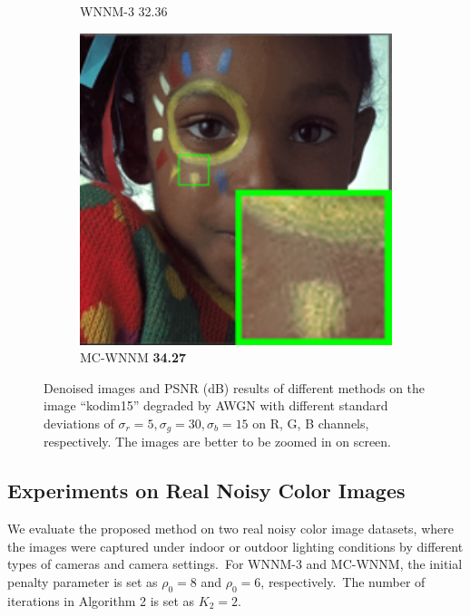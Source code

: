 \begin{figure}
\begin{subfigure}[t]{0.19\textwidth}
		\caption{WNNM-3 32.36}
    \end{subfigure}
    \hfill
    \begin{subfigure}[t]{0.19\textwidth}
        \centering
        \includegraphics[width=1\textwidth]{images/mcwnnm/24images/resize_br_CWNNM_ADMM_nSig53015_kodim15.png}
		\caption{MC-WNNM \textbf{34.27}}
    \end{subfigure}
    \caption{Denoised images and PSNR (dB) results of different methods on the image ``kodim15'' degraded by AWGN with different standard deviations of $\sigma_{r}=5, \sigma_{g}=30, \sigma_{b}=15$ on R, G, B channels, respectively. The images are better to be zoomed in on screen.}
    \label{fig4-8}
\end{figure}


\subsection{Experiments on Real Noisy Color Images}

We evaluate the proposed method on two real noisy color image datasets, where the images were captured under indoor or outdoor lighting conditions by different types of cameras and camera settings.\ For WNNM-3 and MC-WNNM, the initial penalty parameter is set as $\rho_{0}=8$ and $\rho_{0}=6$, respectively.\ The number of iterations in Algorithm 2 is set as $K_{2}=2$.

